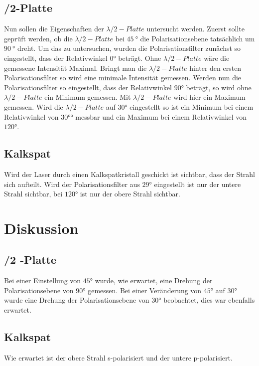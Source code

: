 \subsection{\lambda/2-Platte}
Nun sollen die Eigenschaften der $ \lambda /2 -Platte $ untersucht werden.
Zuerst sollte geprüft werden, ob die $ \lambda /2 -Platte $ bei $ \SI{45}{\degree} $ die Polarisationsebene tatsächlich um $ \SI{90}{\degree} $ dreht. Um das zu untersuchen, wurden die Polarisationsfilter zunächst so eingestellt, dass der Relativwinkel $ 0° $ beträgt. Ohne $ \lambda /2 -Platte $ wäre die gemessene Intensität Maximal. Bringt man die $ \lambda /2 -Platte $ hinter den ersten Polarisationsfilter so wird eine minimale Intensität gemessen. Werden nun die Polarisationsfilter so eingestellt, dass der Relativwinkel $ 90° $ beträgt, so wird ohne $ \lambda /2 -Platte $ ein Minimum gemessen. Mit $ \lambda /2 -Platte $ wird hier ein Maximum gemessen.
Wird die $ \lambda /2 -Platte $ auf $ 30° $ eingestellt so ist ein Minimum bei einem Relativwinkel von $ 30°° $ messbar und ein Maximum bei einem Relativwinkel von $ 120° $.
\subsection{Kalkspat}
Wird der Laser durch einen Kalkspatkristall geschickt ist sichtbar, dass der Strahl sich aufteilt. Wird der Polarisationsfilter aus $ 29° $ eingestellt ist nur der untere Strahl sichtbar, bei $ 120° $ ist nur der obere Strahl sichtbar. 
\section{Diskussion}
\subsection{\lambda /2 -Platte}
Bei einer Einstellung von $ 45° $ wurde, wie erwartet, eine Drehung der Polarisationsebene von $ 90° $ gemessen.
Bei einer Veränderung von $ 45° $ auf $ 30° $ wurde eine Drehung der Polarisationsebene von $ 30° $ beobachtet, dies war ebenfalls erwartet.
\subsection{Kalkspat}
Wie erwartet ist der obere Strahl s-polarisiert und der untere p-polarisiert. 